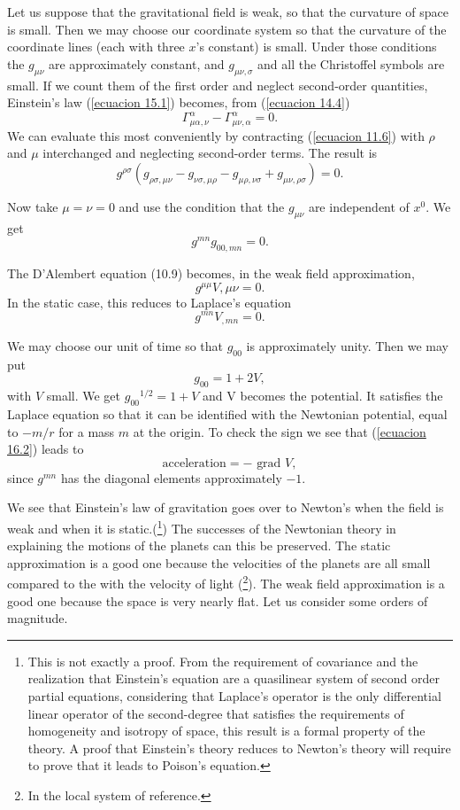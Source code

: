 Let us suppose that the gravitational field is weak, so that the curvature of space is small. Then we may choose our 
coordinate system so that the curvature of the coordinate lines (each with three $x$'s constant) is small. Under those 
conditions the $g_{\mu\nu}$ are approximately constant, and $g_{\mu\nu,\sigma}$ and all the Christoffel symbols are 
small. If we count them of the first order and neglect second-order quantities, Einstein's law (\ref{ecuacion 15.1}) 
becomes, from (\ref{ecuacion 14.4})
\[
 \Gamma^{\alpha}_{\mu\alpha,\nu} - \Gamma^{\alpha}_{\mu\nu,\alpha} = 0.
\]
We can evaluate this most conveniently by contracting (\ref{ecuacion 11.6}) with $\rho$ and $\mu$ interchanged and 
neglecting second-order terms. The result is
\begin{equation}
 \label{ecuacion 16.4}
 g^{\rho\sigma} \left( 
      g_{\rho\sigma,\mu\nu} 
    - g_{\nu\sigma,\mu\rho} 
    - g_{\mu\rho,\nu\sigma} 
    + g_{\mu\nu,\rho\sigma}  \right) = 0.
\end{equation}

Now take $\mu=\nu=0$ and use the condition that the $g_{\mu\nu}$ are independent of $x^0$. We get
\begin{equation}
 \label{ecuacion 16.5}
 g^{mn} g_{00,mn} = 0.
\end{equation}

The D'Alembert equation (10.9) becomes, in the weak field approximation,
\[
 g^{\mu\mu} V{,\mu\nu} = 0.
\]
In the static case, this reduces to Laplace's equation
\[
 g^{mn} V_{,mn} = 0.
\]

We may choose our unit of time so that $g_{00}$ is approximately unity. Then we may put
\begin{equation}
 \label{ecuacion 16.6}
 g_{00} = 1 + 2 V,
\end{equation}
with $V$ small. We get ${g_{00}}^{1/2} = 1 + V$ and V becomes the potential. It satisfies the Laplace equation so that 
it can be identified with the Newtonian potential, equal to $-m/r$ for a mass $m$ at the origin. To check the sign we 
see that (\ref{ecuacion 16.2}) leads to
\[
 \mbox{acceleration} = - \mbox{ grad } V,
\]
since $g^{mn}$ has the diagonal elements approximately $-1$.

We see that Einstein's law of gravitation goes over to Newton's when the field is weak and when it is 
static.(\footnote{This is not exactly a proof. From the requirement of covariance and the realization that Einstein's 
equation are a quasilinear system of second order partial equations, considering that Laplace's operator is the only 
differential linear operator of the second-degree that satisfies the requirements of homogeneity and isotropy of 
space, this result is a formal property of the theory. A proof that Einstein's theory reduces to Newton's theory will 
require to prove that it leads to Poison's equation.}) The successes of the Newtonian theory in explaining the motions 
of the planets can this be preserved. The static approximation is a good one because the velocities of the planets are 
all small compared to the with the velocity of light (\footnote{In the local system of reference.}). The weak field 
approximation is a good one because the space is very nearly flat. Let us consider some orders of magnitude.

